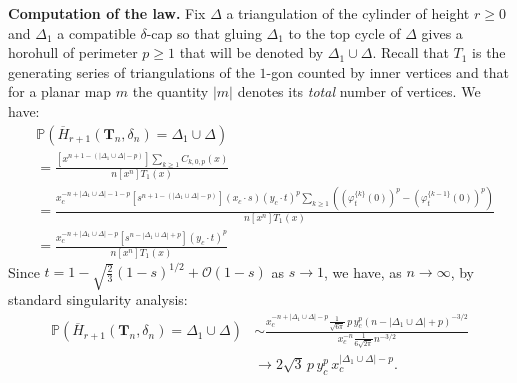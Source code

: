 \documentclass[AHL,XML,longabstracts,Unicode,NoSaveZebib]{cedram}
\begin{document}
\textbf{Computation of the law.} Fix $\Delta$ a triangulation of the cylinder of height $r \geq 0$ and $\Delta_1$ a compatible $\delta$-cap so that gluing $\Delta_1$ to the top cycle of $\Delta$ gives a horohull of perimeter $p\geq 1$ that will be denoted by $\Delta_1 \cup \Delta$. Recall that $T_1$ is the generating series of triangulations of the $1$-gon counted by inner vertices and that for a planar map $m$ the quantity $|m|$ denotes its \emph{total} number of vertices. We have:
\begin{align*}
& \mathbb P \left( \overline{H}_{r+1} (\mathbf T_n ,\delta_n) = \Delta_1 \cup \Delta \right) \\
&  =
\frac{\left[ x^{n+1-(|\Delta_1 \cup \Delta|-p)}\right] \sum_{k\geq 1} C_{k,0,p} (x) }{n \left[ x^{n} \right] T_1 (x)}\\
& = \frac{
x_c^{-n+|\Delta_1 \cup \Delta|-1-p}
\left[ s^{n+1-(|\Delta_1 \cup \Delta|-p)}\right] (x_c \cdot s) (y_c \cdot t)^p
\sum_{k\geq 1} \left( \left(\varphi_t^{\{k\}} (0) \right)^p - \left(\varphi_t^{\{k-1\}} (0) \right)^p \right) }
{n \left[ x^{n} \right] T_1 (x)}\\
&  =
\frac{
x_c^{-n+|\Delta_1 \cup \Delta|-p}
\left[ s^{n-|\Delta_1 \cup \Delta|+p}\right] (y_c \cdot t)^p
}
{n \left[ x^{n} \right] T_1 (x)}
\end{align*}
Since $t = 1 - \sqrt{\frac{2}{3}} (1-s)^{1/2} + \mathcal O (1-s)$ as $s\to 1$, we have, as $n \to \infty$, by standard singularity analysis:
\begin{align}
\mathbb P \left( \overline{H}_{r+1} (\mathbf T_n ,\delta_n) = \Delta_1 \cup \Delta \right)
&\sim
\frac{
x_c^{-n + |\Delta_1 \cup \Delta| - p }
\frac{1}{\sqrt{6 \pi}} \,p \, y_c^p \left(n-|\Delta_1 \cup \Delta|+p \right)^{-3/2}
}
{x_c^{-n} \frac{1}{6 \sqrt{2 \pi}} n^{-3/2}}\nonumber \\
&\rightarrow 2 \sqrt{3} \, p \, y_c^p \, x_c^{|\Delta_1 \cup \Delta|-p} \label{eq:interessant}.
\end{align}
\end{document}

